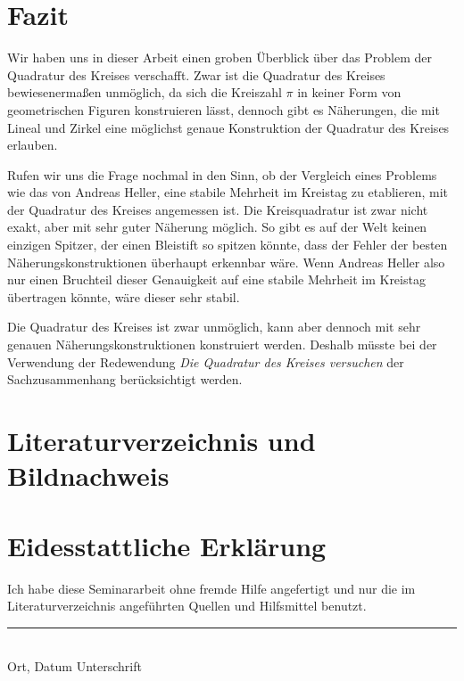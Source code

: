 \documentclass[11pt]{article}
\begin{document}
 \section{Fazit}
 Wir haben uns in dieser Arbeit einen groben Überblick über das Problem der Quadratur des Kreises verschafft. Zwar ist die Quadratur des Kreises bewiesenermaßen unmöglich, da sich die Kreiszahl $\pi$ in keiner Form von geometrischen Figuren konstruieren lässt, dennoch gibt es Näherungen, die mit Lineal und Zirkel eine möglichst genaue Konstruktion der Quadratur des Kreises erlauben. \par
Rufen wir uns die Frage nochmal in den Sinn, ob der Vergleich eines Problems wie das von Andreas Heller, eine stabile Mehrheit im Kreistag zu etablieren, mit der Quadratur des Kreises angemessen ist. Die Kreisquadratur ist zwar nicht exakt, aber mit sehr guter Näherung möglich. So gibt es auf der Welt keinen einzigen Spitzer, der einen Bleistift so spitzen könnte, dass der Fehler der besten Näherungskonstruktionen überhaupt erkennbar wäre. Wenn Andreas Heller also nur einen Bruchteil dieser Genauigkeit auf eine stabile Mehrheit im Kreistag übertragen könnte, wäre dieser sehr stabil. \par Die Quadratur des Kreises ist zwar unmöglich, kann aber dennoch mit sehr genauen Näherungskonstruktionen konstruiert werden. Deshalb müsste bei der Verwendung der Redewendung \glqq \textit{Die Quadratur des Kreises versuchen}\grqq{} der Sachzusammenhang berücksichtigt werden.
\clearpage\newpage

\section{Literaturverzeichnis und Bildnachweis}
\newpage
\section{Eidesstattliche Erklärung}
\glqq Ich habe diese Seminararbeit ohne fremde Hilfe angefertigt und nur die im 
Literaturverzeichnis angeführten Quellen und Hilfsmittel benutzt.\grqq{}\newline\newline\newline
\rule{8cm}{0.4pt}\\
Ort, Datum \qquad\qquad\quad Unterschrift
\end{document}

